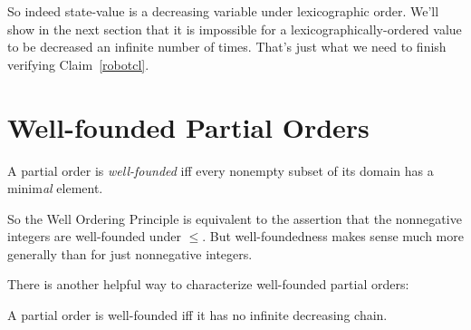 So indeed state-value is a decreasing variable under lexicographic order.
We'll show in the next section that it is impossible for a
lexicographically-ordered value to be decreased an infinite number of
times.  That's just what we need to finish verifying Claim~\ref{robotcl}.

\section{Well-founded Partial Orders}

\begin{definition}\label{wfpo}
  A partial order is \emph{well-founded} iff every nonempty subset of its
  domain has a minim\emph{al} element.
\end{definition}

\iffalse
That is, $m \in S$ is minimal if $m' \preceq m$ implies that $m' =
m$ for all $m' \in S$.\fi

So the Well Ordering Principle is equivalent to the assertion that the
nonnegative integers are well-founded under $\leq$.  But well-foundedness
makes sense much more generally than for just nonnegative integers.
\iffalse

For example, by Lemma~\ref{finmin}, every partially ordered finite set has
a minimal element, so all finite partial orders are automatically well
founded.  Note that in this case we can't expect to find a minim\emph{um}
element, since even in a finite partial order, there often isn't any
minimum.


\textbf{Quick Exercise:} Give an example of a partial order with a
\emph{unique} minim\emph{al} element but no minim\emph{um} element.

\hint It can't be a finite partial order.

\solution{The set of all real numbers totally ordered by $\leq$ has no
minimal element.  We can regard $\le$ as a partial order on $\reals \union
\set{i}$, where $i$ is the complex number $\sqrt{-1}$, by agreeing that $i$
is not comparable to every real number.  This makes $i$ the unique minimal
element -- it's also the unique maximal element -- but there is no minimum
element.}
\fi

There is another helpful way to characterize well-founded partial orders:
{\begin{lemma}\label{d-chain}
A partial order is well-founded iff it has no infinite decreasing chain.
\end{lemma}}

